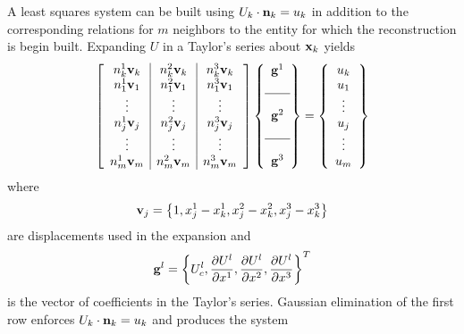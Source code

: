 \documentclass[12pt]{article}
\begin{document}
A least squares system can be built using $U_k\cdot{\bf n}_k=u_k$ in addition
to the corresponding relations for $m$ neighbors to the entity for which the
reconstruction is begin built.  Expanding $U$ in a Taylor's series about ${\bf x}_k$ 
yields
\begin{eqnarray}
\left[\begin{array}{c|c|c}
n_k^{1}{\bf v}_k & n_k^{2}{\bf v}_k & n_k^{3}{\bf v}_k\\
n_1^{1}{\bf v}_1 & n_1^{2}{\bf v}_1 & n_1^{3}{\bf v}_1\\
\vdots      & \vdots      & \vdots \\
n_j^{1}{\bf v}_j & n_j^{2}{\bf v}_j & n_j^{3}{\bf v}_j\\
\vdots      & \vdots      & \vdots \\
n^{1}_{m}{\bf v}_{m} & n^{2}_{m}{\bf v}_{m} & n^{3}_{m}{\bf v}_{m}\end{array}\right]
\left\{\begin{array}{c}  {\bf g}^1\\ \\ \hline \\ {\bf g}^2 \\ \\\hline\\ {\bf g}^3\end{array}\right\}
= \left\{\begin{array}{c} u_k\\ u_1\\\vdots\\u_j\\\vdots\\u_{m}\end{array}\right\}\label{eq:lsq}
\end{eqnarray}
where
\begin{eqnarray*}
{\bf v}_j = \left\{1, x^1_j-x^1_k, x^2_j-x^2_k, x^3_j-x^3_k\right\}
\end{eqnarray*}
are displacements used in the expansion and 
\begin{eqnarray*}
{\bf g}^l = \left\{U^l_c,
\frac{\partial U^l}{\partial x^1}, \frac{\partial U^l}{\partial x^2},\frac{\partial U^l}{\partial x^3}\right\}^T 
\end{eqnarray*}
is the vector of coefficients in the Taylor's series.  Gaussian elimination of
the first row enforces $U_k\cdot{\bf n}_k=u_k$ and produces the system
\end{document}
